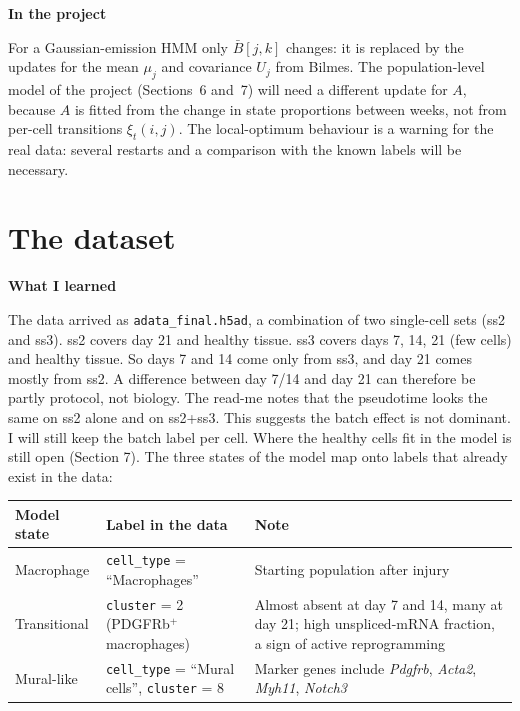 \documentclass[10pt,a4paper]{article}
\newcommand{\sub}[1]{\vspace{1pt}\textbf{\textcolor{gray!80!black}{#1}}\par}
\begin{document}
\sub{In the project}
For a Gaussian-emission HMM only $\bar{B}[j,k]$ changes: it is replaced by the updates for the mean $\mu_j$ and covariance $U_j$ from Bilmes. The population-level model of the project (Sections~6 and~7) will need a different update for $A$, because $A$ is fitted from the change in state proportions between weeks, not from per-cell transitions $\xi_t(i,j)$. The local-optimum behaviour is a warning for the real data: several restarts and a comparison with the known labels will be necessary.

\section{The dataset}

\sub{What I learned}
The data arrived as \texttt{adata\_final.h5ad}, a combination of two single-cell sets (ss2 and ss3). ss2 covers day 21 and healthy tissue. ss3 covers days 7, 14, 21 (few cells) and healthy tissue. So days 7 and 14 come only from ss3, and day 21 comes mostly from ss2. A difference between day 7/14 and day 21 can therefore be partly protocol, not biology. The read-me notes that the pseudotime looks the same on ss2 alone and on ss2+ss3. This suggests the batch effect is not dominant. I will still keep the batch label per cell. Where the healthy cells fit in the model is still open (Section 7). The three states of the model map onto labels that already exist in the data:

\begin{center}
\renewcommand{\arraystretch}{1.1}\small
\begin{tabular}{@{}>{\raggedright\arraybackslash}p{3.2cm} >{\raggedright\arraybackslash}p{5.6cm} >{\raggedright\arraybackslash}p{7.4cm}@{}}
\toprule
\textbf{Model state} & \textbf{Label in the data} & \textbf{Note} \\
\midrule
Macrophage & \texttt{cell\_type} = ``Macrophages'' & Starting population after injury \\
Transitional & \texttt{cluster} = 2 (PDGFRb$^{+}$ macrophages) & Almost absent at day 7 and 14, many at day 21; high unspliced-mRNA fraction, a sign of active reprogramming \\
Mural-like & \texttt{cell\_type} = ``Mural cells'', \texttt{cluster} = 8 & Marker genes include \textit{Pdgfrb}, \textit{Acta2}, \textit{Myh11}, \textit{Notch3} \\
\bottomrule
\end{tabular}
\end{center}
\end{document}
